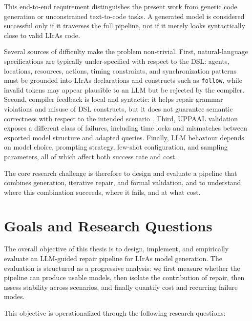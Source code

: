 This end-to-end requirement distinguishes the present work from generic code generation or unconstrained text-to-code tasks.
A generated model is considered successful only if it traverses the full pipeline, not if it merely looks syntactically close to valid LIrAs code.

Several sources of difficulty make the problem non-trivial.
First, natural-language specifications are typically under-specified with respect to the DSL: agents, locations, resources, actions, timing constraints, and synchronization patterns must be grounded into LIrAs declarations and constructs such as \texttt{follow}, while invalid tokens may appear plausible to an LLM but be rejected by the compiler.
Second, compiler feedback is local and syntactic: it helps repair grammar violations and misuse of DSL constructs, but it does not guarantee semantic correctness with respect to the intended scenario \cite{copley2026repair}.
Third, UPPAAL validation exposes a different class of failures, including time locks and mismatches between exported model structure and adapted queries.
Finally, LLM behaviour depends on model choice, prompting strategy, few-shot configuration, and sampling parameters, all of which affect both success rate and cost.

The core research challenge is therefore to design and evaluate a pipeline that combines generation, iterative repair, and formal validation, and to understand where this combination succeeds, where it fails, and at what cost.

\section{Goals and Research Questions}
\label{sec:research_questions}

The overall objective of this thesis is to design, implement, and empirically evaluate an LLM-guided repair pipeline for LIrAs model generation.
The evaluation is structured as a progressive analysis: we first measure whether the pipeline can produce usable models, then isolate the contribution of repair, then assess stability across scenarios, and finally quantify cost and recurring failure modes.

This objective is operationalized through the following research questions:

